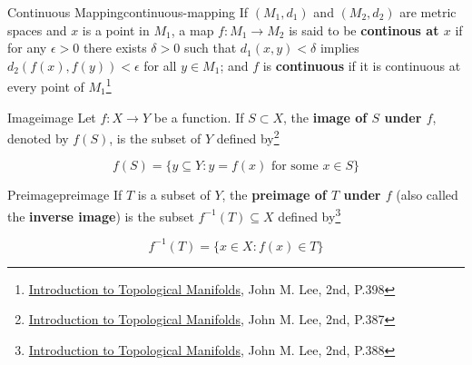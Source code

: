\begin{Definition}{Continuous Mapping}{continuous-mapping}
    If $(M_1, d_1)$ and $(M_2, d_2)$ are metric spaces and $x$ is a point in $M_1$, a map $f: M_1 \rightarrow M_2$ is
    said to be \textbf{continous at $x$} if for any $\epsilon > 0$ there exists $\delta > 0$ such that
    $d_1(x, y) < \delta$ implies $d_2(f(x), f(y)) < \epsilon$ for all $y \in M_1$; and $f$ is \textbf{continuous} if it
    is continuous at every point of $M_1$\footnote{\href{https://trello.com/c/SI33o8fG}{Introduction to Topological Manifolds}, John M. Lee, 2nd, P.398}
\end{Definition}

\begin{Definition}{Image}{image}
    Let $f: X \rightarrow Y$ be a function. If $S \subset X$, the \textbf{image of $S$ under $f$}, denoted by $f(S)$, is
    the subset of $Y$ defined by\footnote{\href{https://trello.com/c/SI33o8fG}{Introduction to Topological Manifolds}, John M. Lee, 2nd, P.387}

    \begin{equation}
        f(S) = \{ y \subseteq Y: y = f(x) \text{ for some } x \in S \}
    \end{equation}
\end{Definition}

\begin{Definition}{Preimage}{preimage}
    If $T$ is a subset of $Y$, the \textbf{preimage of $T$ under $f$} (also called the \textbf{inverse image}) is the
    subset $f^{-1}(T) \subseteq X$ defined by\footnote{\href{https://trello.com/c/SI33o8fG}{Introduction to Topological Manifolds}, John M. Lee, 2nd, P.388}

    \begin{equation}
        f^{-1}(T) = \{ x \in X : f(x) \in T \}
    \end{equation}
\end{Definition}


